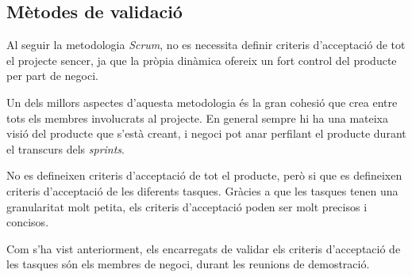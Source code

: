 \subsection{Mètodes de validació}

Al seguir la metodologia \textit{Scrum}, no es necessita definir criteris d'acceptació de tot el projecte sencer, ja que la pròpia dinàmica ofereix un fort control del producte per part de negoci.

Un dels millors aspectes d'aquesta metodologia és la gran cohesió que crea entre tots els membres involucrats al projecte. En general sempre hi ha una mateixa visió del producte que s'està creant, i negoci pot anar perfilant el producte durant el transcurs dels \textit{sprints}.

No es defineixen criteris d'acceptació de tot el producte, però si que es defineixen criteris d'acceptació de les diferents tasques. Gràcies a que les tasques tenen una granularitat molt petita, els criteris d'acceptació poden ser molt precisos i concisos.

Com s'ha vist anteriorment, els encarregats de validar els criteris d'acceptació de les tasques són els membres de negoci, durant les reunions de demostració.